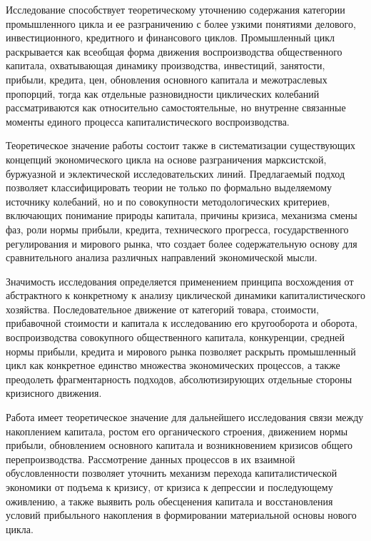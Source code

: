 Исследование способствует теоретическому уточнению содержания категории промышленного цикла и ее разграничению с более узкими понятиями делового, инвестиционного, кредитного и финансового циклов. Промышленный цикл раскрывается как всеобщая форма движения воспроизводства общественного капитала, охватывающая динамику производства, инвестиций, занятости, прибыли, кредита, цен, обновления основного капитала и межотраслевых пропорций, тогда как отдельные разновидности циклических колебаний рассматриваются как относительно самостоятельные, но внутренне связанные моменты единого процесса капиталистического воспроизводства.

Теоретическое значение работы состоит также в систематизации существующих концепций экономического цикла на основе разграничения марксистской, буржуазной и эклектической исследовательских линий. Предлагаемый подход позволяет классифицировать теории не только по формально выделяемому источнику колебаний, но и по совокупности методологических критериев, включающих понимание природы капитала, причины кризиса, механизма смены фаз, роли нормы прибыли, кредита, технического прогресса, государственного регулирования и мирового рынка, что создает более содержательную основу для сравнительного анализа различных направлений экономической мысли.

Значимость исследования определяется применением принципа восхождения от абстрактного к конкретному к анализу циклической динамики капиталистического хозяйства. Последовательное движение от категорий товара, стоимости, прибавочной стоимости и капитала к исследованию его кругооборота и оборота, воспроизводства совокупного общественного капитала, конкуренции, средней нормы прибыли, кредита и мирового рынка позволяет раскрыть промышленный цикл как конкретное единство множества экономических процессов, а также преодолеть фрагментарность подходов, абсолютизирующих отдельные стороны кризисного движения.

Работа имеет теоретическое значение для дальнейшего исследования связи между накоплением капитала, ростом его органического строения, движением нормы прибыли, обновлением основного капитала и возникновением кризисов общего перепроизводства. Рассмотрение данных процессов в их взаимной обусловленности позволяет уточнить механизм перехода капиталистической экономики от подъема к кризису, от кризиса к депрессии и последующему оживлению, а также выявить роль обесценения капитала и восстановления условий прибыльного накопления в формировании материальной основы нового цикла.

